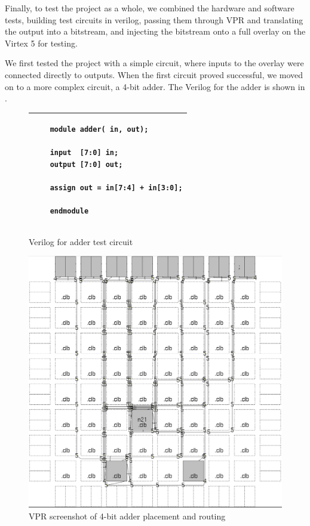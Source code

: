 Finally, to test the project as a whole, we combined the hardware and software tests, building test circuits in verilog, passing them through VPR and translating the output into a bitstream, and injecting the bitstream onto a full overlay on the Virtex 5 for testing.

We first tested the project with a simple circuit, where inputs to the overlay were connected directly to outputs.
When the first circuit proved successful, we moved on to a more complex circuit, a 4-bit adder.
The Verilog for the adder is shown in .

\begin{figure}[!h]
	\centering
	\begin{tabular}{|p{13cm}|}
	\hline
	\begin{verbatim}
	module adder( in, out);

	input  [7:0] in;
	output [7:0] out;

	assign out = in[7:4] + in[3:0];

	endmodule
	\end{verbatim}
	\\ \hline
	\end{tabular}
	\caption{Verilog for adder test circuit}
	\label{adder-verilog}
\end{figure}

\begin{figure}[!h]
	\centering
	\includegraphics[scale=0.3]{vpr-adder.png}
	\caption{VPR screenshot of 4-bit adder placement and routing}
	\label{adder-vpr}
\end{figure}

